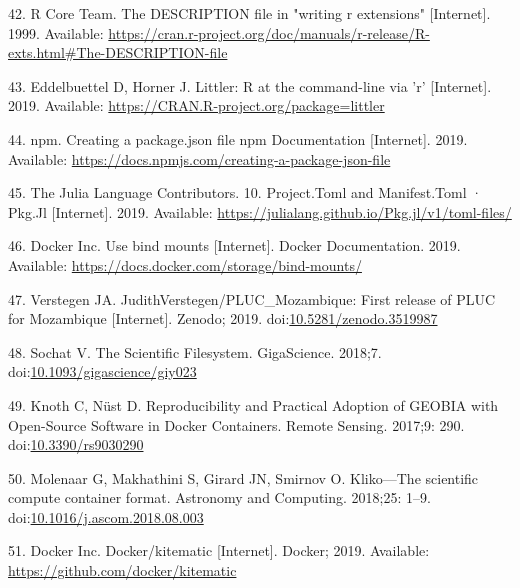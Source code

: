 \documentclass[10pt,letterpaper]{article}
\begin{document}
\leavevmode\hypertarget{ref-r_core_team_description_1999}{}%
42. R Core Team. The DESCRIPTION file in "writing r extensions"
{[}Internet{]}. 1999. Available:
\url{https://cran.r-project.org/doc/manuals/r-release/R-exts.html\#The-DESCRIPTION-file}

\leavevmode\hypertarget{ref-eddelbuettel_littler_2019}{}%
43. Eddelbuettel D, Horner J. Littler: R at the command-line via 'r'
{[}Internet{]}. 2019. Available:
\url{https://CRAN.R-project.org/package=littler}

\leavevmode\hypertarget{ref-npm_creating_2019}{}%
44. npm. Creating a package.json file npm Documentation {[}Internet{]}.
2019. Available:
\url{https://docs.npmjs.com/creating-a-package-json-file}

\leavevmode\hypertarget{ref-julia_tomls_2019}{}%
45. The Julia Language Contributors. 10. Project.Toml and Manifest.Toml
· Pkg.Jl {[}Internet{]}. 2019. Available:
\url{https://julialang.github.io/Pkg.jl/v1/toml-files/}

\leavevmode\hypertarget{ref-docker_use_2019}{}%
46. Docker Inc. Use bind mounts {[}Internet{]}. Docker Documentation.
2019. Available: \url{https://docs.docker.com/storage/bind-mounts/}

\leavevmode\hypertarget{ref-verstegen_pluc_mozambique_2019}{}%
47. Verstegen JA. JudithVerstegen/PLUC\_Mozambique: First release of
PLUC for Mozambique {[}Internet{]}. Zenodo; 2019.
doi:\href{https://doi.org/10.5281/zenodo.3519987}{10.5281/zenodo.3519987}

\leavevmode\hypertarget{ref-sochat_scientific_2018}{}%
48. Sochat V. The Scientific Filesystem. GigaScience. 2018;7.
doi:\href{https://doi.org/10.1093/gigascience/giy023}{10.1093/gigascience/giy023}

\leavevmode\hypertarget{ref-knoth_reproducibility_2017}{}%
49. Knoth C, Nüst D. Reproducibility and Practical Adoption of GEOBIA
with Open-Source Software in Docker Containers. Remote Sensing. 2017;9:
290. doi:\href{https://doi.org/10.3390/rs9030290}{10.3390/rs9030290}

\leavevmode\hypertarget{ref-molenaar_klikoscientific_2018}{}%
50. Molenaar G, Makhathini S, Girard JN, Smirnov O. Kliko---The
scientific compute container format. Astronomy and Computing. 2018;25:
1--9.
doi:\href{https://doi.org/10.1016/j.ascom.2018.08.003}{10.1016/j.ascom.2018.08.003}

\leavevmode\hypertarget{ref-docker_kitematic_2019}{}%
51. Docker Inc. Docker/kitematic {[}Internet{]}. Docker; 2019.
Available: \url{https://github.com/docker/kitematic}
\end{document}

